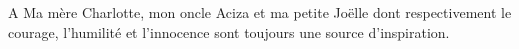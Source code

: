 A Ma mère Charlotte, mon oncle Aciza et ma petite Joëlle dont respectivement le courage, l'humilité et l'innocence sont toujours une source d'inspiration.
